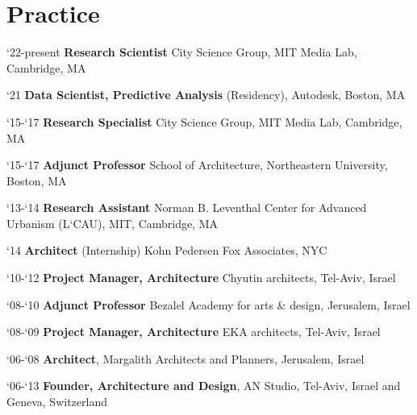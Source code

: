 \section*{Practice}

\begin{tablist}
   \item[`22-present]\tab\textbf{Research Scientist}
   City Science Group, MIT Media Lab, Cambridge, MA 

   \item[`21]\tab\textbf{Data Scientist, Predictive Analysis} (Residency),
   Autodesk, Boston, MA

    \item[`15-`17]\tab\textbf{Research Specialist}
   City Science Group, MIT Media Lab, Cambridge, MA

   \item[`15-`17]\tab\textbf{Adjunct Professor}
   School of Architecture, Northeastern University, Boston, MA

   \item[`13-`14]\tab\textbf{Research Assistant}
   Norman B. Leventhal Center for Advanced Urbanism (L`CAU), MIT, Cambridge, MA

   \item[`14]\tab\textbf{Architect} (Internship)
   Kohn Pedersen Fox Associates, NYC

   \item[`10-`12]\tab
   \textbf{Project Manager, Architecture} Chyutin architects, Tel-Aviv, Israel

   \item[`08-`10]\tab\textbf{Adjunct Professor}
   Bezalel Academy for arts \& design, Jerusalem, Israel

   \item[`08-`09]\tab\textbf{Project Manager, Architecture}
   EKA architects, Tel-Aviv, Israel

   \item[`06-`08]\tab\textbf{Architect},
   Margalith Architects and Planners, Jerusalem, Israel

   \item[`06-`13]\tab
   \textbf{Founder, Architecture and Design},
   AN Studio, Tel-Aviv, Israel and Geneva, Switzerland
\end{tablist}
